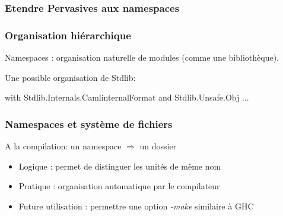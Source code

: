 \documentclass{beamer}
\begin{document}
\begin{frame}[fragile]
\frametitle{Etendre Pervasives aux namespaces}






\end{frame}

\begin{frame}[fragile]
\frametitle{Organisation hiérarchique}
Namespaces : organisation naturelle de modules (comme une bibliothèque).

\medskip
\pause

Une possible organisation de Stdlib:
\begin{OCaml}
with Stdlib.Internals.CamlinternalFormat
and Stdlib.Unsafe.Obj
...
\end{OCaml}
\end{frame}

\begin{frame}
\frametitle{Namespaces et système de fichiers}

A la compilation: un namespace $\Rightarrow$ un dossier

\medskip

\pause

\begin{itemize}[<+->]
\item Logique : permet de distinguer les unités de même nom
\item Pratique : organisation automatique par le compilateur
\item Future utilisation : permettre une option \emph{-make} similaire à GHC
\end{itemize}

\end{frame}
\end{document}
